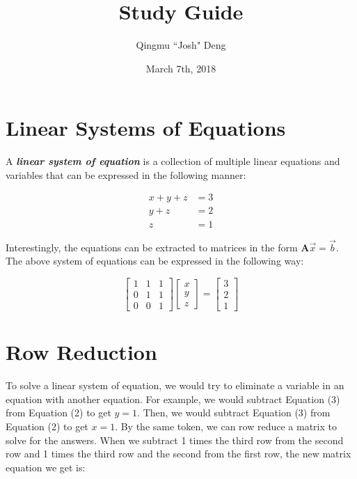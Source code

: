 \documentclass[11pt]{article}
\begin{document}
\title{Study Guide}
\author{Qingmu ``Josh" Deng}
\date{March 7th, 2018}

\maketitle
\section{Linear Systems of Equations}
A \emph{\textbf{linear system of equation}} is a collection of multiple linear equations and variables that can be expressed in the following manner:

\begin{align}
    x +  y + z  &= 3 \\
         y +  z &= 2 \\
              z &= 1
\end{align}

Interestingly, the equations can be extracted to matrices in the form $\textbf{A}\vec{x} = \vec{b}$. The above system of equations can be expressed in the following way:

\[
\begin{bmatrix}
    1 & 1 & 1 \\
    0 & 1 & 1 \\
    0 & 0 & 1 
\end{bmatrix}
\begin{bmatrix}
    x\\y\\z
\end{bmatrix}
=
\begin{bmatrix}
    3\\2\\1
\end{bmatrix}
\]

\section{Row Reduction}
To solve a linear system of equation, we would try to eliminate a variable in an equation with another equation. For example, we would subtract Equation (3) from Equation (2) to get $y = 1$. Then, we would subtract Equation (3) from Equation (2) to get $x = 1$. By the same token, we can row reduce a matrix to solve for the answers. When we subtract 1 times the third row from the second row and 1 times the third row and the second from the first row, the new matrix equation we get is:
\end{document}
